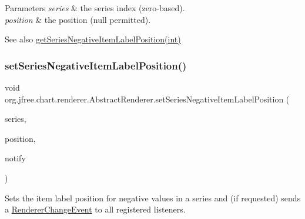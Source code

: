 \begin{DoxyParams}{Parameters}
{\em series} & the series index (zero-\/based). \\
\hline
{\em position} & the position ({\ttfamily null} permitted).\\
\hline
\end{DoxyParams}
\begin{DoxySeeAlso}{See also}
\mbox{\hyperlink{classorg_1_1jfree_1_1chart_1_1renderer_1_1_abstract_renderer_a2ec8c993651d531262e314d8b1336756}{get\+Series\+Negative\+Item\+Label\+Position(int)}} 
\end{DoxySeeAlso}
\mbox{\label{classorg_1_1jfree_1_1chart_1_1renderer_1_1_abstract_renderer_adc16846df5676475814ee85d04a22f2d}} 
\subsubsection{\texorpdfstring{set\+Series\+Negative\+Item\+Label\+Position()}{setSeriesNegativeItemLabelPosition()}\hspace{0.1cm}{\footnotesize\ttfamily [2/2]}}
{\footnotesize\ttfamily void org.\+jfree.\+chart.\+renderer.\+Abstract\+Renderer.\+set\+Series\+Negative\+Item\+Label\+Position (\begin{DoxyParamCaption}\item[{int}]{series,  }\item[{\mbox{\hyperlink{classorg_1_1jfree_1_1chart_1_1labels_1_1_item_label_position}{Item\+Label\+Position}}}]{position,  }\item[{boolean}]{notify }\end{DoxyParamCaption})}

Sets the item label position for negative values in a series and (if requested) sends a \mbox{\hyperlink{}{Renderer\+Change\+Event}} to all registered listeners.


